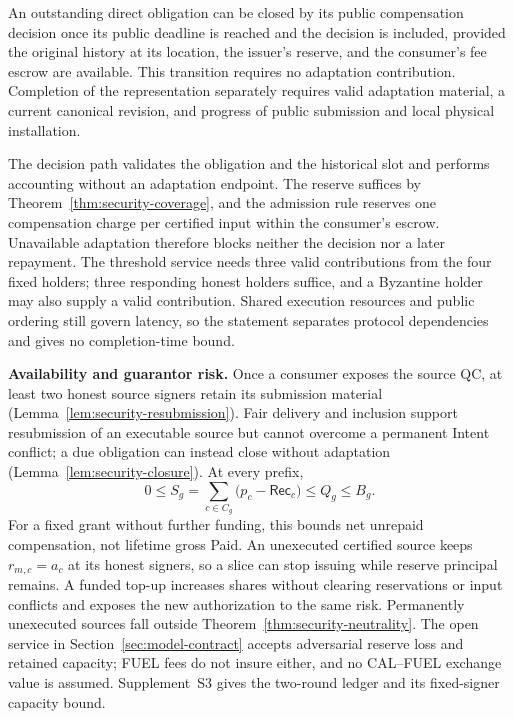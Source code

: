 \begin{lemma}
\label{lem:security-closure}
An outstanding direct obligation can be closed by its public
compensation decision once its public deadline is reached and the
decision is included, provided the original history at its location, the
issuer's reserve, and the consumer's fee escrow are available. This
transition requires no adaptation contribution. Completion of the
representation separately requires valid adaptation material, a current
canonical revision, and progress of public submission and local physical
installation.
\end{lemma}
\begin{IEEEproof}
The decision path validates the obligation and the historical slot and performs accounting without an adaptation endpoint. The reserve suffices by Theorem~\ref{thm:security-coverage}, and the admission rule reserves one compensation charge per certified input within the consumer's escrow. Unavailable adaptation therefore blocks neither the decision nor a later repayment. The threshold service needs three valid contributions from the four fixed holders; three responding honest holders suffice, and a Byzantine holder may also supply a valid contribution. Shared execution resources and public ordering still govern latency, so the statement separates protocol dependencies and gives no completion-time bound.
\end{IEEEproof}

\noindent\textbf{Availability and guarantor risk.}
Once a consumer exposes the source QC, at least two honest source
signers retain its submission material
(Lemma~\ref{lem:security-resubmission}). Fair delivery and inclusion
support resubmission of an executable source but cannot overcome a
permanent Intent conflict; a due obligation can instead close without
adaptation (Lemma~\ref{lem:security-closure}). At every prefix,
\[
  0\le S_g=\sum_{c\in C_g}
       \bigl(p_c-\mathsf{Rec}_c\bigr)\le Q_g\le B_g .
\]
For a fixed grant without further funding, this bounds net unrepaid
compensation, not lifetime gross Paid. An unexecuted certified source
keeps $r_{m,c}=a_c$ at its honest signers, so a slice can stop issuing
while reserve principal remains. A funded top-up increases shares
without clearing reservations or input conflicts and exposes the new
authorization to the same risk. Permanently unexecuted sources fall
outside Theorem~\ref{thm:security-neutrality}. The open service in
Section~\ref{sec:model-contract} accepts adversarial reserve loss and
retained capacity; FUEL fees do not insure either, and no CAL--FUEL
exchange value is assumed. Supplement~S3 gives the two-round ledger
and its fixed-signer capacity bound.
